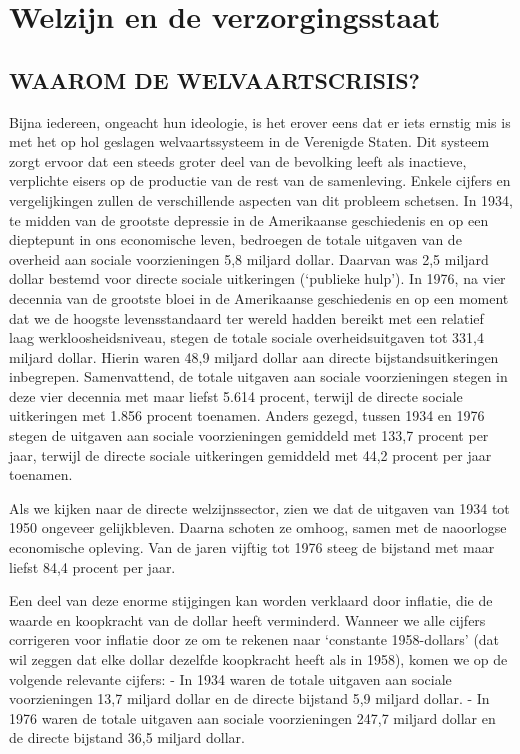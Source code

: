\documentclass[
  a5paper,
  smalldemyvopaper,10pt,twoside,onecolumn,openright,extrafontsizes,hidelinks]{memoir}
\begin{document}

\chapter{Welzijn en de
verzorgingsstaat}\label{welzijn-en-de-verzorgingsstaat}

\section{WAAROM DE WELVAARTSCRISIS?}\label{waarom-de-welvaartscrisis}

Bijna iedereen, ongeacht hun ideologie, is het erover eens dat er iets
ernstig mis is met het op hol geslagen welvaartssysteem in de Verenigde
Staten. Dit systeem zorgt ervoor dat een steeds groter deel van de
bevolking leeft als inactieve, verplichte eisers op de productie van de
rest van de samenleving. Enkele cijfers en vergelijkingen zullen de
verschillende aspecten van dit probleem schetsen. In 1934, te midden van
de grootste depressie in de Amerikaanse geschiedenis en op een
dieptepunt in ons economische leven, bedroegen de totale uitgaven van de
overheid aan sociale voorzieningen 5,8 miljard dollar. Daarvan was 2,5
miljard dollar bestemd voor directe sociale uitkeringen (`publieke
hulp'). In 1976, na vier decennia van de grootste bloei in de
Amerikaanse geschiedenis en op een moment dat we de hoogste
levensstandaard ter wereld hadden bereikt met een relatief laag
werkloosheidsniveau, stegen de totale sociale overheidsuitgaven tot
331,4 miljard dollar. Hierin waren 48,9 miljard dollar aan directe
bijstandsuitkeringen inbegrepen. Samenvattend, de totale uitgaven aan
sociale voorzieningen stegen in deze vier decennia met maar liefst 5.614
procent, terwijl de directe sociale uitkeringen met 1.856 procent
toenamen. Anders gezegd, tussen 1934 en 1976 stegen de uitgaven aan
sociale voorzieningen gemiddeld met 133,7 procent per jaar, terwijl de
directe sociale uitkeringen gemiddeld met 44,2 procent per jaar
toenamen.

Als we kijken naar de directe welzijnssector, zien we dat de uitgaven
van 1934 tot 1950 ongeveer gelijkbleven. Daarna schoten ze omhoog, samen
met de naoorlogse economische opleving. Van de jaren vijftig tot 1976
steeg de bijstand met maar liefst 84,4 procent per jaar.

Een deel van deze enorme stijgingen kan worden verklaard door inflatie,
die de waarde en koopkracht van de dollar heeft verminderd. Wanneer we
alle cijfers corrigeren voor inflatie door ze om te rekenen naar
`constante 1958-dollars' (dat wil zeggen dat elke dollar dezelfde
koopkracht heeft als in 1958), komen we op de volgende relevante
cijfers: - In 1934 waren de totale uitgaven aan sociale voorzieningen
13,7 miljard dollar en de directe bijstand 5,9 miljard dollar. - In 1976
waren de totale uitgaven aan sociale voorzieningen 247,7 miljard dollar
en de directe bijstand 36,5 miljard dollar.
\end{document}
